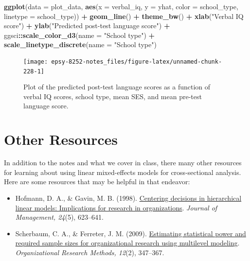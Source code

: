 \documentclass[]{book}
\newenvironment{Shaded}{\begin{snugshade}}{\end{snugshade}}
\newcommand{\DataTypeTok}[1]{\textcolor[rgb]{0.13,0.29,0.53}{#1}}
\newcommand{\KeywordTok}[1]{\textcolor[rgb]{0.13,0.29,0.53}{\textbf{#1}}}
\newcommand{\NormalTok}[1]{#1}
\newcommand{\OperatorTok}[1]{\textcolor[rgb]{0.81,0.36,0.00}{\textbf{#1}}}
\newcommand{\StringTok}[1]{\textcolor[rgb]{0.31,0.60,0.02}{#1}}
\providecommand{\tightlist}{%
  \setlength{\itemsep}{0pt}\setlength{\parskip}{0pt}}
\begin{document}
\begin{Shaded}
\begin{Highlighting}[]
\KeywordTok{ggplot}\NormalTok{(}\DataTypeTok{data =}\NormalTok{ plot_data, }\KeywordTok{aes}\NormalTok{(}\DataTypeTok{x =}\NormalTok{ verbal_iq, }\DataTypeTok{y =}\NormalTok{ yhat, }\DataTypeTok{color =}\NormalTok{ school_type, }\DataTypeTok{linetype =}\NormalTok{ school_type)) }\OperatorTok{+}
\StringTok{  }\KeywordTok{geom_line}\NormalTok{() }\OperatorTok{+}
\StringTok{  }\KeywordTok{theme_bw}\NormalTok{() }\OperatorTok{+}
\StringTok{  }\KeywordTok{xlab}\NormalTok{(}\StringTok{"Verbal IQ score"}\NormalTok{) }\OperatorTok{+}
\StringTok{  }\KeywordTok{ylab}\NormalTok{(}\StringTok{"Predicted post-test language score"}\NormalTok{) }\OperatorTok{+}
\StringTok{  }\NormalTok{ggsci}\OperatorTok{::}\KeywordTok{scale_color_d3}\NormalTok{(}\DataTypeTok{name =} \StringTok{"School type"}\NormalTok{) }\OperatorTok{+}
\StringTok{  }\KeywordTok{scale_linetype_discrete}\NormalTok{(}\DataTypeTok{name =} \StringTok{"School type"}\NormalTok{)}
\end{Highlighting}
\end{Shaded}

\begin{figure}

{\centering \texttt{[image: epsy-8252-notes\_files/figure-latex/unnamed-chunk-228-1]} 

}

\caption{Plot of the predicted post-test language scores as a function of verbal IQ scores, school type, mean SES, and mean pre-test language score. }\label{fig:unnamed-chunk-228}
\end{figure}

\hypertarget{other-resources-3}{%
\section*{Other Resources}\label{other-resources-3}}

In addition to the notes and what we cover in class, there many other resources for learning about using linear mixed-effects models for cross-sectional analysis. Here are some resources that may be helpful in that endeavor:

\begin{itemize}
\tightlist
\item
  Hofmann, D. A., \& Gavin, M. B. (1998). \href{https://primo.lib.umn.edu/primo-explore/fulldisplay?docid=TN_sciversesciencedirect_elsevierS0149-2063(99)80077-4\&context=PC\&vid=TWINCITIES\&search_scope=mncat_discovery\&tab=article_discovery\&lang=en_US}{Centering decisions in hierarchical linear models: Implications for research in organizations}. \emph{Journal of Management, 24}(5), 623--641.
\item
  Scherbaum, C. A., \& Ferreter, J. M. (2009). \href{https://journals-sagepub-com.ezp2.lib.umn.edu/doi/pdf/10.1177/1094428107308906}{Estimating statistical power and required sample sizes for organizational research using multilevel modeling}. \emph{Organizational Research Methods, 12}(2), 347--367.
\end{itemize}
\end{document}
